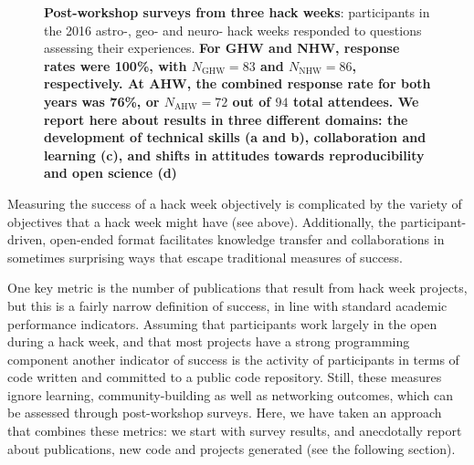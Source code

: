 \begin{figure}[h!]
\caption{{\bf Post-workshop surveys from three hack weeks}: participants in the 2016 astro-, geo- and neuro- hack weeks responded to questions assessing their experiences. \textbf{For GHW and NHW, response rates were 100\%, with $N_{\mathrm{GHW}}= 83$ and $N_{\mathrm{NHW}} = 86$, respectively. At AHW, the combined response rate for both years was 76\%, or $N_{\mathrm{AHW}} = 72$ out of $94$ total attendees. We report here about results in three different domains: the development of technical skills (a and b), collaboration and learning (c), and shifts in attitudes towards reproducibility and open science (d)}}
\label{fig:survey}
\end{figure}

Measuring the success of a hack week objectively is complicated by the variety of objectives that a hack week might have (see above). 
Additionally, the participant-driven, open-ended format facilitates knowledge transfer and collaborations in sometimes surprising ways that escape traditional measures of success.

One key metric is the number of publications that result from hack week projects, but this is a fairly narrow definition of success, in line with standard academic performance indicators.
Assuming that participants work largely in the open during a hack week, and that most projects have a strong programming component another indicator of success is the activity of participants in terms of code written and committed to a public code repository.
Still, these measures ignore learning, community-building as well as networking outcomes, which can be assessed through post-workshop surveys.
Here, we have taken an approach that combines these metrics: we start with survey results, and anecdotally report about publications, new code and projects generated (see the following section).


